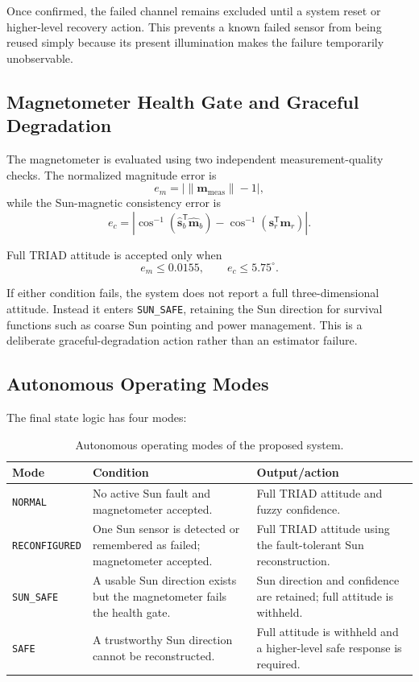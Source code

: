 \documentclass[11pt,a4paper]{article}
\begin{document}
Once confirmed, the failed channel remains excluded until a system reset or higher-level recovery action. This prevents a known failed sensor from being reused simply because its present illumination makes the failure temporarily unobservable.

\subsection{Magnetometer Health Gate and Graceful Degradation}

The magnetometer is evaluated using two independent measurement-quality checks. The normalized magnitude error is
\begin{equation}
    e_m=
    \left|\|\mathbf{m}_{\mathrm{meas}}\|-1\right|,
\end{equation}
while the Sun-magnetic consistency error is
\begin{equation}
    e_c=
    \left|
    \cos^{-1}(\hat{\mathbf{s}}_b^\mathsf{T}\hat{\mathbf{m}}_b)
    -
    \cos^{-1}(\mathbf{s}_r^\mathsf{T}\mathbf{m}_r)
    \right|.
\end{equation}

Full TRIAD attitude is accepted only when
\begin{equation}
    e_m\leq0.0155,
    \qquad
    e_c\leq5.75^\circ.
\end{equation}

If either condition fails, the system does not report a full three-dimensional attitude. Instead it enters \texttt{SUN\_SAFE}, retaining the Sun direction for survival functions such as coarse Sun pointing and power management. This is a deliberate graceful-degradation action rather than an estimator failure.

\subsection{Autonomous Operating Modes}

The final state logic has four modes:
\begin{table}[H]
\centering
\caption{Autonomous operating modes of the proposed system.}
\label{tab:modes}
\small
\renewcommand{\arraystretch}{1.15}
\begin{tabularx}{\textwidth}{|p{2.6cm}|X|X|}
\hline
\textbf{Mode} & \textbf{Condition} & \textbf{Output/action} \\
\hline
\texttt{NORMAL} & No active Sun fault and magnetometer accepted. & Full TRIAD attitude and fuzzy confidence. \\
\hline
\texttt{RECONFIGURED} & One Sun sensor is detected or remembered as failed; magnetometer accepted. & Full TRIAD attitude using the fault-tolerant Sun reconstruction. \\
\hline
\texttt{SUN\_SAFE} & A usable Sun direction exists but the magnetometer fails the health gate. & Sun direction and confidence are retained; full attitude is withheld. \\
\hline
\texttt{SAFE} & A trustworthy Sun direction cannot be reconstructed. & Full attitude is withheld and a higher-level safe response is required. \\
\hline
\end{tabularx}
\end{table}
\end{document}
